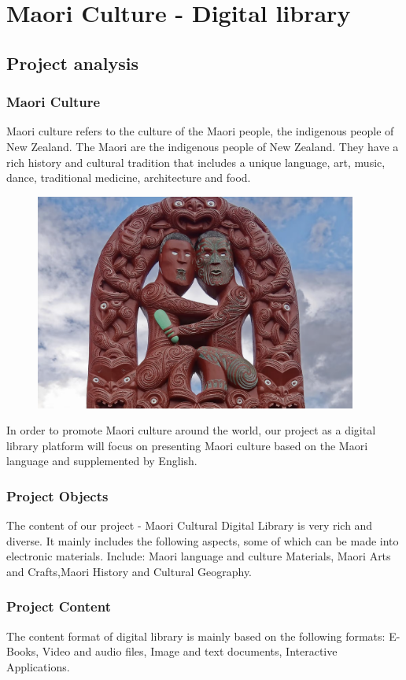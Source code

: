 \chapter{Maori Culture - Digital library}

\section{Project analysis}
\subsection{Maori Culture}
Maori culture refers to the culture of the Maori people, the indigenous people of New Zealand. The Maori are the indigenous people of New Zealand. They have a rich history and cultural tradition that includes a unique language, art, music, dance, traditional medicine, architecture and food.

\begin{figure}[htbp]
  \centerline{\includegraphics[width=300pt]{images/M1-1.png}}
\end{figure}

In order to promote Maori culture around the world, our project as a digital library platform will focus on presenting Maori culture based on the Maori language and supplemented by English.

\subsection{Project Objects}
The content of our project - Maori Cultural Digital Library is very rich and diverse. It mainly includes the following aspects, some of which can be made into electronic materials. Include: Maori language and culture Materials, Maori Arts and Crafts,Maori History and Cultural Geography.

\subsection{Project Content}
The content format of digital library is mainly based on the following formats:
E-Books, Video and audio files, Image and text documents, Interactive Applications.

